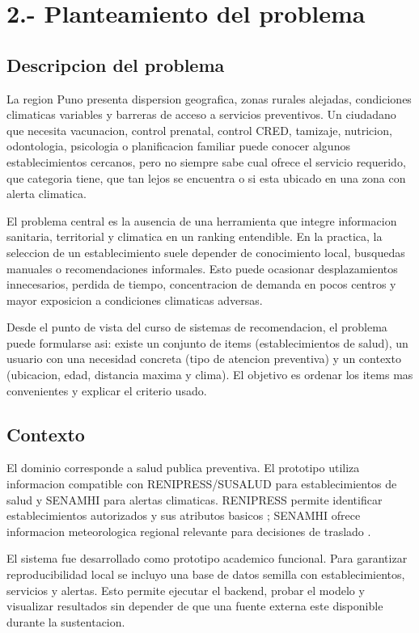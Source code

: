 \documentclass[12pt,a4paper]{article}
\begin{document}
\section{2.- Planteamiento del problema}
\subsection{Descripcion del problema}
La region Puno presenta dispersion geografica, zonas rurales alejadas, condiciones climaticas variables y barreras de acceso a servicios preventivos. Un ciudadano que necesita vacunacion, control prenatal, control CRED, tamizaje, nutricion, odontologia, psicologia o planificacion familiar puede conocer algunos establecimientos cercanos, pero no siempre sabe cual ofrece el servicio requerido, que categoria tiene, que tan lejos se encuentra o si esta ubicado en una zona con alerta climatica.

El problema central es la ausencia de una herramienta que integre informacion sanitaria, territorial y climatica en un ranking entendible. En la practica, la seleccion de un establecimiento suele depender de conocimiento local, busquedas manuales o recomendaciones informales. Esto puede ocasionar desplazamientos innecesarios, perdida de tiempo, concentracion de demanda en pocos centros y mayor exposicion a condiciones climaticas adversas.

Desde el punto de vista del curso de sistemas de recomendacion, el problema puede formularse asi: existe un conjunto de items (establecimientos de salud), un usuario con una necesidad concreta (tipo de atencion preventiva) y un contexto (ubicacion, edad, distancia maxima y clima). El objetivo es ordenar los items mas convenientes y explicar el criterio usado.

\subsection{Contexto}
El dominio corresponde a salud publica preventiva. El prototipo utiliza informacion compatible con RENIPRESS/SUSALUD para establecimientos de salud y SENAMHI para alertas climaticas. RENIPRESS permite identificar establecimientos autorizados y sus atributos basicos \citep{susalud2026}; SENAMHI ofrece informacion meteorologica regional relevante para decisiones de traslado \citep{senamhi2026}.

El sistema fue desarrollado como prototipo academico funcional. Para garantizar reproducibilidad local se incluyo una base de datos semilla con establecimientos, servicios y alertas. Esto permite ejecutar el backend, probar el modelo y visualizar resultados sin depender de que una fuente externa este disponible durante la sustentacion.
\end{document}

